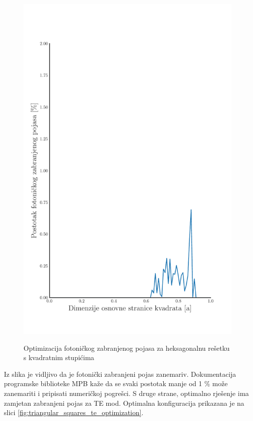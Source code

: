 \documentclass[utf8, seminar, numeric]{fer}
\begin{document}
\begin{figure}[ht]
    {\includegraphics[width=0.8\linewidth]{./images/pdf/optimization_block.pdf}}%
	\caption{Optimizacija fotoničkog zabranjenog pojasa za heksagonalnu rešetku s
	kvadratnim stupićima}
	\label{fig:triangular_squares_optimization}
\end{figure}

Iz slika je vidljivo da je fotonički zabranjeni pojas zanemariv.
Dokumentacija programske biblioteke MPB kaže da se svaki postotak manje od 1 \%
može zanemariti i pripisati numeričkoj pogrešci. S druge strane, optimalno
rješenje ima zamjetan zabranjeni pojas za TE mod. Optimalna konfiguracija
prikazana je na slici \ref{fig:triangular_squares_te_optimization}.
\end{document}
